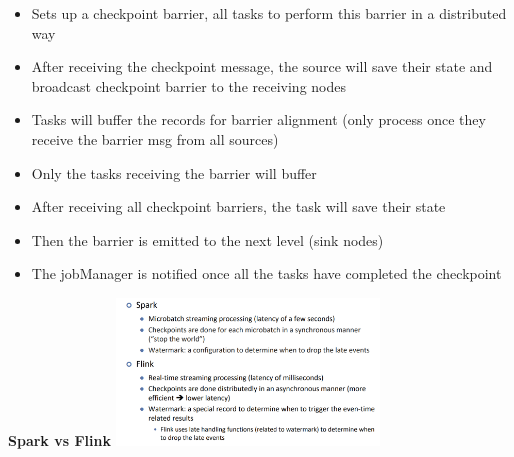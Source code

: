 \documentclass[10pt, landscape]{article}
\begin{document}
\begin{multicols}{4}
\begin{itemize}
\begin{itemize}
    \item Sets up a checkpoint barrier, all tasks to perform this barrier in a distributed way 
    \item After receiving the checkpoint message, the source will save their state and broadcast checkpoint barrier to the receiving nodes 
    \item Tasks will buffer the records for barrier alignment (only process once they receive the barrier msg from all sources)
    \item Only the tasks receiving the barrier will buffer
    \item After receiving all checkpoint barriers, the task will save their state
    \item Then the barrier is emitted to the next level (sink nodes)
    \item The jobManager is notified once all the tasks have completed the checkpoint 
  \end{itemize}
\end{itemize}

\textbf{Spark vs Flink}
\includegraphics*[width=7cm]{spark vs flink.png}

\end{multicols}
\end{document}
